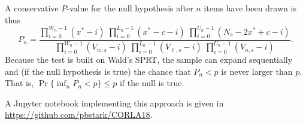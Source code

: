 \documentclass[runningheads]{llncs}
\begin{document}
A conservative $P$-value for the null hypothesis after $n$ items have been drawn is thus
$$
   P_n =  \frac{\prod_{i=0}^{W_n-1} (x^*-i) \; \prod_{i=0}^{L_n-1}  (x^*-c-i) \; \prod_{i=0}^{U_n-1} (N_s-2x^*+c-i)}{\prod_{i=0}^{W_n-1}(V_{w,s}-i) \; \prod_{i=0}^{L_n-1} (V_{\ell,s}-i) \; \prod_{i=0}^{U_n-1} (V_{u,s}-i)}.
$$
Because the test is built on Wald's SPRT,  the sample can expand sequentially and 
(if the null hypothesis is true) the chance that $P_n < p$ is never larger than $p$.
That is, $\Pr \{ \inf_n P_n < p \} \le p$ if the null is true.

A Jupyter notebook implementing this approach is given in \url{https://github.com/pbstark/CORLA18}.



\end{document}
